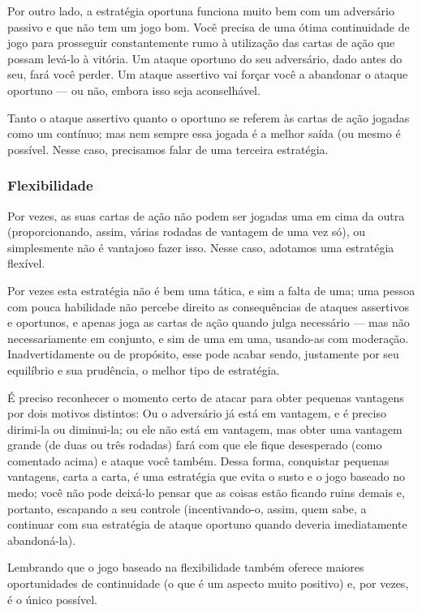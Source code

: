 Por outro lado, a estratégia oportuna funciona muito bem com um adversário passivo e que não tem um jogo bom. Você precisa de uma ótima continuidade de jogo para prosseguir constantemente rumo à utilização das cartas de ação que possam levá-lo à vitória. Um ataque oportuno do seu adversário, dado antes do seu, fará você perder. Um ataque assertivo vai forçar você a abandonar o ataque oportuno --- ou não, embora isso seja aconselhável.

Tanto o ataque assertivo quanto o oportuno se referem às cartas de ação jogadas como um contínuo; mas nem sempre essa jogada é a melhor saída (ou mesmo é possível. Nesse caso, precisamos falar de uma terceira estratégia.

\subsubsection{Flexibilidade}

Por vezes, as suas cartas de ação não podem ser jogadas uma em cima da outra (proporcionando, assim, várias rodadas de vantagem de uma vez só), ou simplesmente não é vantajoso fazer isso. Nesse caso, adotamos uma estratégia flexível.

Por vezes esta estratégia não é bem uma tática, e sim a falta de uma; uma pessoa com pouca habilidade não percebe direito as consequências de ataques assertivos e oportunos, e apenas joga as cartas de ação quando julga necessário --- mas não necessariamente em conjunto, e sim de uma em uma, usando-as com moderação. Inadvertidamente ou de propósito, esse pode acabar sendo, justamente por seu equilíbrio e sua prudência, o melhor tipo de estratégia.

É preciso reconhecer o momento certo de atacar para obter pequenas vantagens por dois motivos distintos: Ou o adversário já está em vantagem, e é preciso dirimi-la ou diminui-la; ou ele não está em vantagem, mas obter uma vantagem grande (de duas ou três rodadas) fará com que ele fique desesperado (como comentado acima) e ataque você também. Dessa forma, conquistar pequenas vantagens, carta a carta, é uma estratégia que evita o susto e o jogo baseado no medo; você não pode deixá-lo pensar que as coisas estão ficando ruins demais e, portanto, escapando a seu controle (incentivando-o, assim, quem sabe, a continuar com sua estratégia de ataque oportuno quando deveria imediatamente abandoná-la).

Lembrando que o jogo baseado na flexibilidade também oferece maiores oportunidades de continuidade (o que é um aspecto muito positivo) e, por vezes, é o único possível.

